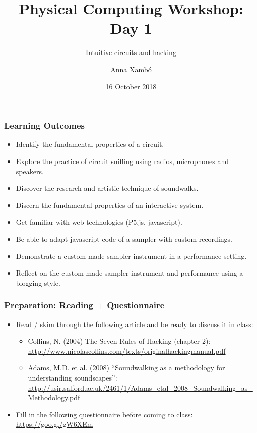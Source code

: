\documentclass[screen, aspectratio=43]{beamer}
\title[PCW-d1]{Physical Computing Workshop: Day 1}
\subtitle{Intuitive circuits and hacking}
\author[A. Xamb{\'o}]{Anna Xamb{\'o}}
\institute[NTNU]{Department of Music, NTNU}
\date{16 October 2018}
\begin{document}
\begin{frame}
  \titlepage
\end{frame}
%
\begin{frame}
  \frametitle{Learning Outcomes}
  \begin{itemize}
    \item Identify the fundamental properties of a circuit.
    \item Explore the practice of circuit sniffing using radios, microphones and speakers.
    \item Discover the research and artistic technique of soundwalks.
    \item Discern the fundamental properties of an interactive system.
    \item Get familiar with web technologies (P5.js, javascript).
    \item Be able to adapt javascript code of a sampler with custom recordings. 
    \item Demonstrate a custom-made sampler instrument in a performance setting.
    \item Reflect on the custom-made sampler instrument and performance using a blogging style.
    \end{itemize}
\end{frame}
%
\begin{frame}
  \frametitle{Preparation: Reading + Questionnaire}
        \begin{itemize}
        \item Read / skim through the following article and be ready to discuss it in class:
         \begin{itemize}
         \item Collins, N. (2004) The Seven Rules of Hacking (chapter 2):\\
         \url{http://www.nicolascollins.com/texts/originalhackingmanual.pdf}
         \item  Adams, M.D. et al. (2008) ``Soundwalking as a methodology for understanding soundscapes'':\\
         \url{http://usir.salford.ac.uk/2461/1/Adams_etal_2008_Soundwalking_as_Methodology.pdf}
         \end{itemize}
        \item Fill in the following questionnaire before coming to class: \\
 	\url{https://goo.gl/gW6XEm}       
         \end{itemize}
\end{frame}
%
\end{document}
